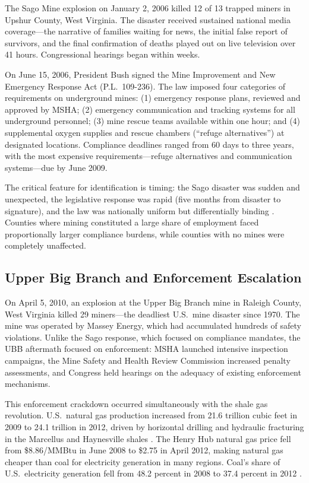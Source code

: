 \documentclass[12pt]{article}
\begin{document}
The Sago Mine explosion on January 2, 2006 killed 12 of 13 trapped miners in Upshur County, West Virginia. The disaster received sustained national media coverage---the narrative of families waiting for news, the initial false report of survivors, and the final confirmation of deaths played out on live television over 41 hours. Congressional hearings began within weeks.

On June 15, 2006, President Bush signed the Mine Improvement and New Emergency Response Act (P.L.\ 109-236). The law imposed four categories of requirements on underground mines: (1) emergency response plans, reviewed and approved by MSHA; (2) emergency communication and tracking systems for all underground personnel; (3) mine rescue teams available within one hour; and (4) supplemental oxygen supplies and rescue chambers (``refuge alternatives'') at designated locations. Compliance deadlines ranged from 60 days to three years, with the most expensive requirements---refuge alternatives and communication systems---due by June 2009.

The critical feature for identification is timing: the Sago disaster was sudden and unexpected, the legislative response was rapid (five months from disaster to signature), and the law was nationally uniform but differentially binding \citep{msha2011report}. Counties where mining constituted a large share of employment faced proportionally larger compliance burdens, while counties with no mines were completely unaffected.

\subsection{Upper Big Branch and Enforcement Escalation}

On April 5, 2010, an explosion at the Upper Big Branch mine in Raleigh County, West Virginia killed 29 miners---the deadliest U.S.\ mine disaster since 1970. The mine was operated by Massey Energy, which had accumulated hundreds of safety violations. Unlike the Sago response, which focused on compliance mandates, the UBB aftermath focused on enforcement: MSHA launched intensive inspection campaigns, the Mine Safety and Health Review Commission increased penalty assessments, and Congress held hearings on the adequacy of existing enforcement mechanisms.

This enforcement crackdown occurred simultaneously with the shale gas revolution. U.S.\ natural gas production increased from 21.6 trillion cubic feet in 2009 to 24.1 trillion in 2012, driven by horizontal drilling and hydraulic fracturing in the Marcellus and Haynesville shales \citep{hausman2016welfare}. The Henry Hub natural gas price fell from \$8.86/MMBtu in June 2008 to \$2.75 in April 2012, making natural gas cheaper than coal for electricity generation in many regions. Coal's share of U.S.\ electricity generation fell from 48.2 percent in 2008 to 37.4 percent in 2012 \citep{eia2023electricity}.
\end{document}
